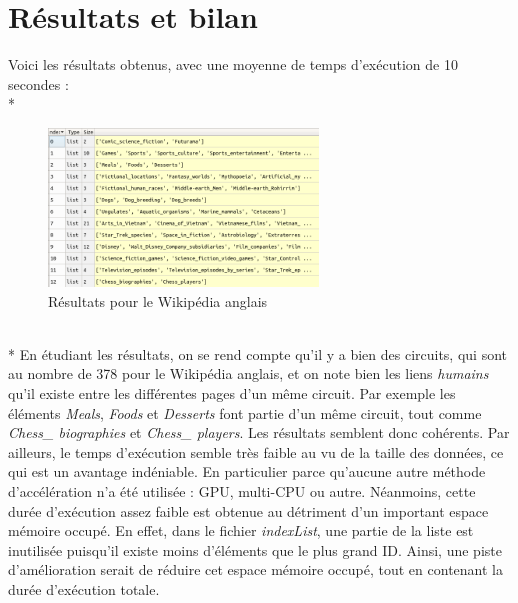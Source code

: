 \documentclass{article}
\begin{document}
\section{R\'{e}sultats et bilan}

Voici les r\'{e}sultats obtenus, avec une moyenne de temps d'ex\'{e}cution de 10 secondes :
\\*
\begin{figure}[h]
\begin{center}
\includegraphics[width=0.64\textwidth]{consoleResultat}
\caption{R\'{e}sultats pour le Wikip\'{e}dia anglais}
\end{center}
\end{figure}
~\\*
En \'{e}tudiant les r\'{e}sultats, on se rend compte qu'il y a bien des circuits, qui sont au nombre de 378 pour le Wikip\'{e}dia anglais, et on note bien les liens \textit{humains} qu'il existe entre les diff\'{e}rentes pages d'un m\^{e}me circuit. Par exemple les \'{e}l\'{e}ments \textit{Meals}, \textit{Foods} et \textit{Desserts} font partie d'un m\^{e}me circuit, tout comme \textit{Chess\_ biographies} et \textit{Chess\_ players}. Les r\'{e}sultats semblent donc coh\'{e}rents. Par ailleurs, le temps d'ex\'{e}cution semble tr\`{e}s faible au vu de la taille des donn\'{e}es, ce qui est un avantage ind\'{e}niable. En particulier parce qu'aucune autre m\'{e}thode d'acc\'{e}l\'{e}ration n'a \'{e}t\'{e} utilis\'{e}e : GPU, multi-CPU ou autre. N\'{e}anmoins, cette dur\'{e}e d'ex\'{e}cution assez faible est obtenue au d\'{e}triment d'un important espace m\'{e}moire occup\'{e}. En effet, dans le fichier \textit{indexList}, une partie de la liste est inutilis\'{e}e puisqu'il existe moins d'\'{e}l\'{e}ments que le plus grand ID. Ainsi, une piste d'am\'{e}lioration serait de r\'{e}duire cet espace m\'{e}moire occup\'{e}, tout en contenant la dur\'{e}e d'ex\'{e}cution totale.
\end{document}
